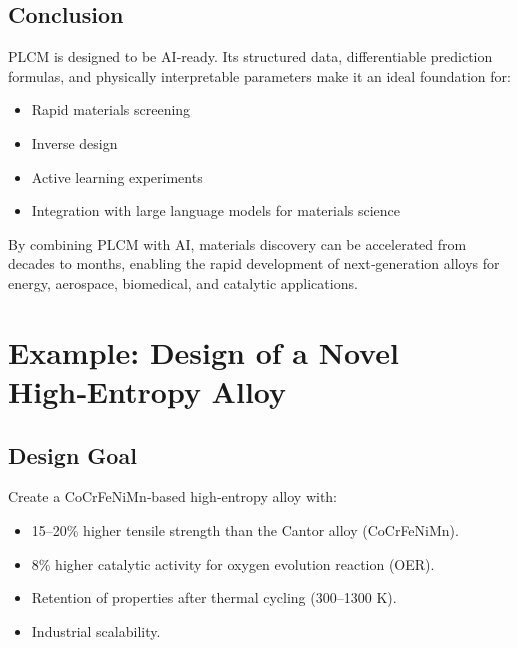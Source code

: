 \documentclass[12pt,a4paper]{article}
\begin{document}
	\subsection{Conclusion}
	
	PLCM is designed to be AI‑ready. Its structured data, differentiable prediction formulas, and physically interpretable parameters make it an ideal foundation for:
	\begin{itemize}
		\item Rapid materials screening
		\item Inverse design
		\item Active learning experiments
		\item Integration with large language models for materials science
	\end{itemize}
	
	By combining PLCM with AI, materials discovery can be accelerated from decades to months, enabling the rapid development of next‑generation alloys for energy, aerospace, biomedical, and catalytic applications.
	
	\section{Example: Design of a Novel High‑Entropy Alloy}
	
	\subsection{Design Goal}
	Create a CoCrFeNiMn‑based high‑entropy alloy with:
	\begin{itemize}
		\item 15–20\% higher tensile strength than the Cantor alloy (CoCrFeNiMn).
		\item 8\% higher catalytic activity for oxygen evolution reaction (OER).
		\item Retention of properties after thermal cycling (300–1300 K).
		\item Industrial scalability.
	\end{itemize}
	
\end{document}
